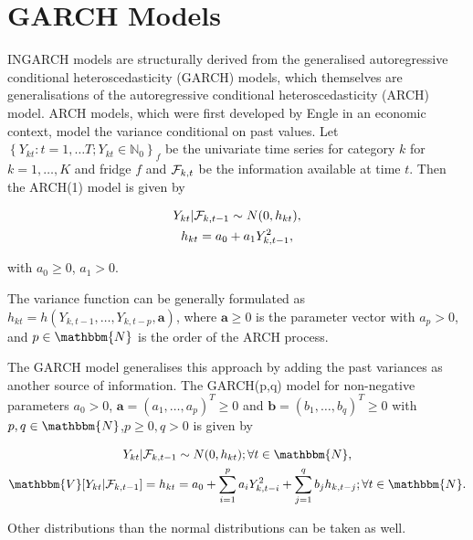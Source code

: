 
\section{GARCH Models}
\label{sec: Garch Models}

INGARCH models are structurally derived from the generalised autoregressive conditional heteroscedasticity (GARCH) models, which themselves are generalisations of the autoregressive conditional heteroscedasticity (ARCH) model. ARCH models, which were first developed by Engle \cite{Engle:1982} in an economic context, model the variance conditional on past values. Let $\left\{Y_{kt}:t=1,\ldots T; Y_{kt} \in \mathbb{N}_0\right\}_f$ be the univariate time series for category $k$ for $k=1,\ldots,K$ and fridge $f$ and $\mathcal{F}_{k,t}$ be the information available at time $t$. Then the ARCH(1) model is given by \cite{Engle:1982}

\begin{gather}
Y_{kt} | \mathcal{F}_{k,t-1} \sim N(0,h_{kt}),\\
h_{kt} = a_0 + a_1 Y_{k,t-1}^2,
\label{eq:ARCH model}
\end{gather}

with $a_0\geq0$, $a_1>0$. 

The variance function can be generally formulated as $h_{kt} = h(Y_{k,t-1},\ldots,Y_{k,t-p},\bm{a})$, where $\bm{a}\geq0$ is the parameter vector with $a_p>0$, and $p \in \mathbbm{N}$ is the order of the ARCH process. 

The GARCH model generalises this approach by adding the past variances as another source of information. The GARCH(p,q) model for non-negative parameters $a_0>0$, $\bm{a}=(a_1,\ldots,a_p)^T\geq 0$ and $\bm{b}=(b_1,\ldots,b_q)^T\geq0$ with $p,q \in \mathbbm{N}$,$p\geq0, q>0$ is given by \cite{Bollerslev:1986}

\begin{gather}
Y_{kt} | \SigA_{k,t-1} \sim N(0,h_{kt}); \forall t \in \mathbbm{N}, \\
\mathbbm{V}[Y_{kt}|\SigA_{k,t-1}]=h_{kt} = a_0 + \sum_{i=1}^p a_i Y_{k,t-i}^2 + \sum_{j=1}^q b_j h_{k,t-j};\forall t \in \mathbbm{N}.
\label{eq:GARCH model}
\end{gather}

Other distributions than the normal distributions can be taken as well. 

